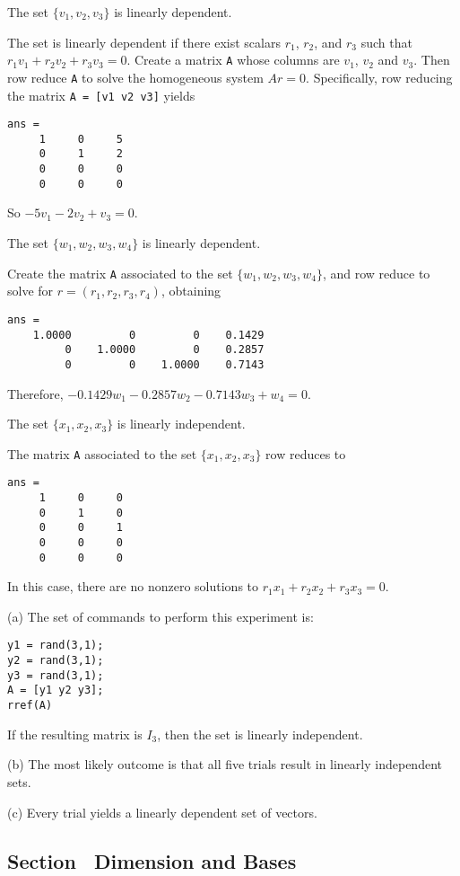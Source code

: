 \documentclass{ximera}
\begin{document}
 \ans The set $\{v_1,v_2,v_3\}$ is linearly dependent.

\soln The set is linearly dependent if there exist scalars $r_1$, $r_2$,
and $r_3$ such that $r_1v_1 + r_2v_2 + r_3v_3 = 0$.  Create a matrix
{\tt A} whose columns are $v_1$, $v_2$ and $v_3$.  Then row reduce
{\tt A} to solve the homogeneous system $Ar = 0$.  Specifically, row
reducing the matrix {\tt A = [v1 v2 v3]} yields
\begin{verbatim}
ans =
     1     0     5
     0     1     2
     0     0     0
     0     0     0
\end{verbatim}
So $-5v_1 - 2v_2 + v_3 = 0$.

 \ans The set $\{w_1,w_2,w_3,w_4\}$ is linearly dependent.

\soln Create the matrix {\tt A} associated to the set
$\{w_1,w_2,w_3,w_4\}$, and row reduce to solve for
$r = (r_1,r_2,r_3,r_4)$, obtaining
\begin{verbatim}
ans =
    1.0000         0         0    0.1429
         0    1.0000         0    0.2857
         0         0    1.0000    0.7143
\end{verbatim}
Therefore, $-0.1429w_1 - 0.2857w_2 - 0.7143w_3 + w_4 = 0$.

 \ans The set $\{x_1,x_2,x_3\}$ is linearly independent.

\soln The matrix {\tt A} associated to the set $\{x_1,x_2,x_3\}$ row
reduces to
\begin{verbatim}
ans =
     1     0     0
     0     1     0
     0     0     1
     0     0     0
     0     0     0
\end{verbatim}
In this case, there are no nonzero solutions to
$r_1x_1 + r_2x_2 + r_3x_3 = 0$.
 
(a) The set of commands to perform this experiment is:
\begin{verbatim}
y1 = rand(3,1);
y2 = rand(3,1);
y3 = rand(3,1);
A = [y1 y2 y3];
rref(A)
\end{verbatim}
If the resulting matrix is $I_3$, then the set is linearly
independent.

(b) The most likely outcome is that all five trials result in
linearly independent sets.

(c) Every trial yields a linearly dependent set of vectors.


\subsection*{Section~\protect{\ref{S:5.5}} Dimension and Bases}
\end{document}
